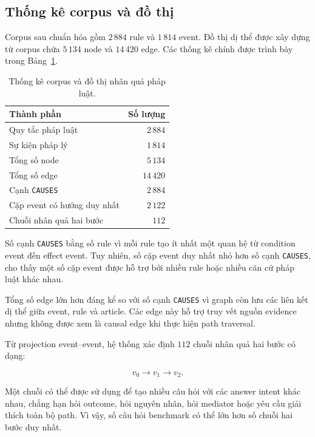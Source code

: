 \subsection{Thống kê corpus và đồ thị}

Corpus sau chuẩn hóa gồm \(2\,884\) rule và \(1\,814\) event. Đồ thị dị thể
được xây dựng từ corpus chứa \(5\,134\) node và \(14\,420\) edge. Các thống
kê chính được trình bày trong Bảng~\ref{tab:graph}.

\begin{table}[t]
    \centering
    \caption{Thống kê corpus và đồ thị nhân quả pháp luật.}
    \label{tab:graph}
    \begin{tabular}{lr}
        \hline
        \textbf{Thành phần} & \textbf{Số lượng} \\
        \hline
        Quy tắc pháp luật & \(2\,884\) \\
        Sự kiện pháp lý & \(1\,814\) \\
        Tổng số node & \(5\,134\) \\
        Tổng số edge & \(14\,420\) \\
        Cạnh \texttt{CAUSES} & \(2\,884\) \\
        Cặp event có hướng duy nhất & \(2\,122\) \\
        Chuỗi nhân quả hai bước & \(112\) \\
        \hline
    \end{tabular}
\end{table}

Số cạnh \texttt{CAUSES} bằng số rule vì mỗi rule tạo ít nhất một quan hệ từ
condition event đến effect event. Tuy nhiên, số cặp event duy nhất nhỏ hơn
số cạnh \texttt{CAUSES}, cho thấy một số cặp event được hỗ trợ bởi nhiều rule
hoặc nhiều căn cứ pháp luật khác nhau.

Tổng số edge lớn hơn đáng kể so với số cạnh \texttt{CAUSES} vì graph còn lưu
các liên kết dị thể giữa event, rule và article. Các edge này hỗ trợ truy
vết nguồn evidence nhưng không được xem là causal edge khi thực hiện path
traversal.

Từ projection event--event, hệ thống xác định \(112\) chuỗi nhân quả hai
bước có dạng:

\[
v_0 \rightarrow v_1 \rightarrow v_2.
\]

Một chuỗi có thể được sử dụng để tạo nhiều câu hỏi với các answer intent
khác nhau, chẳng hạn hỏi outcome, hỏi nguyên nhân, hỏi mediator hoặc yêu cầu
giải thích toàn bộ path. Vì vậy, số câu hỏi benchmark có thể lớn hơn số
chuỗi hai bước duy nhất.

